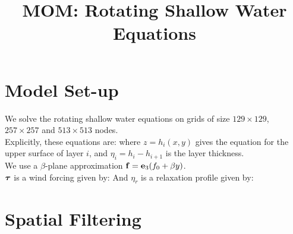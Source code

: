 \documentclass[10pt]{article}
\begin{document}
\title{MOM: Rotating Shallow Water Equations}
\date{}
\maketitle

\section{Model Set-up}

We solve the rotating shallow water equations on grids of size $129\times 129$, $257\times 257$ and $513\times 513$ nodes.\\
\linebreak
Explicitly, these equations are:
where $z = h_{i}(x,y)$ gives the equation for the upper surface of layer $i$, and $\eta_{i} = h_{i} - h_{i+1}$ is the layer thickness. \\
\linebreak
We use a $\beta$-plane approximation $\mathbf{f} = \mathbf{e}_{3}(f_{0} + \beta y)$. \\
\linebreak
$\boldsymbol{\tau}$ is a wind forcing given by:
And $\eta_{r}$ is a relaxation profile given by:
\section{Spatial Filtering}
\end{document}

